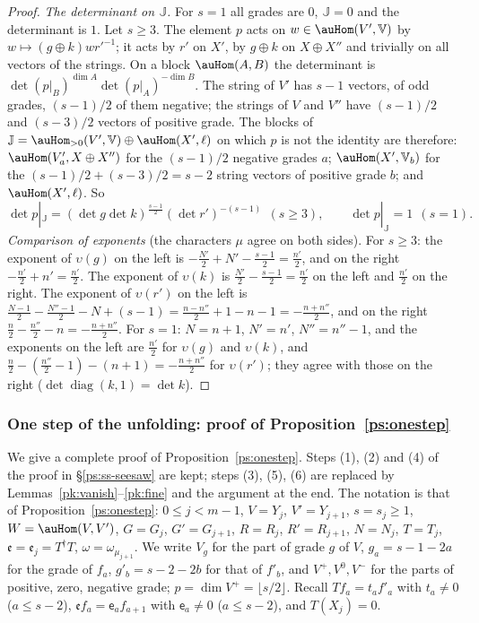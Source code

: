 \documentclass[10pt]{amsart}
\theoremstyle{definition}
\theoremstyle{remark}
\begin{document}
\begin{proof}
\emph{The determinant on $\mathbb J$.} For $s=1$ all grades are $0$, $\mathbb J=0$ and the
determinant is $1$. Let $s\ge3$. The element $p$ acts on $w\in\auHom(V',\mathbb V)$ by
$w\mapsto(g\oplus k)wr'^{-1}$; it acts by $r'$ on $X'$, by $g\oplus k$ on $X\oplus X''$ and
trivially on all vectors of the strings. On a block $\auHom(A,B)$ the determinant is
$\det(p|_B)^{\dim A}\det(p|_A)^{-\dim B}$. The string of $V'$ has $s-1$ vectors, of odd grades,
$(s-1)/2$ of them negative; the strings of $V$ and $V''$ have $(s-1)/2$ and $(s-3)/2$ vectors of
positive grade. The blocks of $\mathbb J=\auHom_{>0}(V',\mathbb V)\oplus\auHom(X',\ell)$ on which
$p$ is not the identity are therefore: $\auHom(V'_a,X\oplus X'')$ for the $(s-1)/2$ negative
grades $a$; $\auHom(X',\mathbb V_b)$ for the $(s-1)/2+(s-3)/2=s-2$ string vectors of positive
grade $b$; and $\auHom(X',\ell)$. So
\[
\det p|_{\mathbb J}=(\det g\det k)^{\frac{s-1}2}(\det r')^{-(s-1)}\ \ (s\ge3),\qquad\det p|_{\mathbb
J}=1\ \ (s=1).
\]
\emph{Comparison of exponents} (the characters $\mu$ agree on both sides). For $s\ge3$: the
exponent of $\upsilon(g)$ on the left is $-\frac{N'}2+N'-\frac{s-1}2=\frac{n'}2$, and on the right
$-\frac{n'}2+n'=\frac{n'}2$. The exponent of $\upsilon(k)$ is $\frac{N'}2-\frac{s-1}2=\frac{n'}2$
on the left and $\frac{n'}2$ on the right. The exponent of $\upsilon(r')$ on the left is
$\frac{N-1}2-\frac{N''-1}2-N+(s-1)=\frac{n-n''}2+1-n-1=-\frac{n+n''}2$, and on the right
$\frac n2-\frac{n''}2-n=-\frac{n+n''}2$. For $s=1$: $N=n+1$, $N'=n'$, $N''=n''-1$, and the exponents
on the left are $\frac{n'}2$ for $\upsilon(g)$ and $\upsilon(k)$, and $\frac n2-(\frac{n''}2-1)-
(n+1)=-\frac{n+n''}2$ for $\upsilon(r')$; they agree with those on the right ($\det\operatorname{diag}
(k,1)=\det k$).
\end{proof}

\subsubsection{One step of the unfolding: proof of Proposition~\ref{ps:onestep}}\label{pk:ss-onestep}

We give a complete proof of Proposition~\ref{ps:onestep}. Steps (1), (2) and (4) of the proof in
\S\ref{ps:ss-seesaw} are kept; steps (3), (5), (6) are replaced by
Lemmas~\ref{pk:vanish}--\ref{pk:fine} and the argument at the end. The notation is that of
Proposition~\ref{ps:onestep}: $0\le j<m-1$, $V=Y_j$, $V'=Y_{j+1}$, $s=s_j\ge1$,
$W=\auHom(V,V')$, $G=G_j$, $G'=G_{j+1}$, $R=R_j$, $R'=R_{j+1}$, $N=N_j$, $T=T_j$,
$\mathfrak e=\mathfrak e_j=T^\dagger T$, $\omega=\omega_{\mu_{j+1}}$. We write $V_g$ for the part of
grade $g$ of $V$, $g_a=s-1-2a$ for the grade of $f_a$, $g'_b=s-2-2b$ for that of $f'_b$, and
$V^+,V^0,V^-$ for the parts of positive, zero, negative grade; $p=\dim V^+=\lfloor s/2\rfloor$.
Recall $Tf_a=t_af'_a$ with $t_a\ne0$ ($a\le s-2$), $\mathfrak ef_a=\mathsf e_af_{a+1}$ with
$\mathsf e_a\ne0$ ($a\le s-2$), and $T(X_j)=0$.
\end{document}
